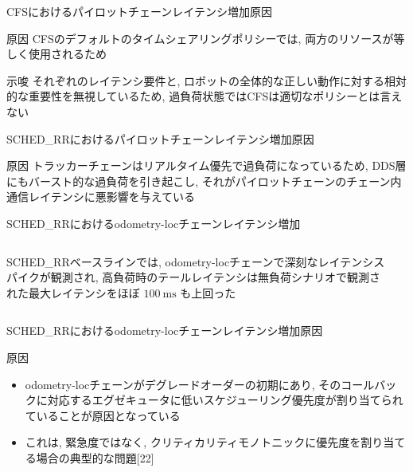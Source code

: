 \begin{frame}{CFSにおけるパイロットチェーンレイテンシ増加原因}
    \begin{block}{原因}
        CFSのデフォルトのタイムシェアリングポリシーでは, 両方のリソースが等しく使用されるため
    \end{block}
    \begin{block}{示唆}
        それぞれのレイテンシ要件と, ロボットの全体的な正しい動作に対する相対的な重要性を無視しているため, 過負荷状態ではCFSは適切なポリシーとは言えない
    \end{block}
\end{frame}

\begin{frame}{SCHED\_RRにおけるパイロットチェーンレイテンシ増加原因}
    \begin{block}{原因}
        トラッカーチェーンはリアルタイム優先で過負荷になっているため, DDS層にもバースト的な過負荷を引き起こし, それがパイロットチェーンのチェーン内通信レイテンシに悪影響を与えている
    \end{block}
\end{frame}

\begin{frame}{SCHED\_RRにおけるodometry-locチェーンレイテンシ増加}
    \begin{columns}
        \begin{column}{0.5\textwidth}
            SCHED\_RRベースラインでは, odometry-locチェーンで深刻なレイテンシスパイクが観測され, 高負荷時のテールレイテンシは無負荷シナリオで観測された最大レイテンシをほぼ $100 \mathrm{~ms}$ も上回った
        \end{column}
        \begin{column}{0.5\textwidth}
        \end{column}
    \end{columns}
\end{frame}

\begin{frame}{SCHED\_RRにおけるodometry-locチェーンレイテンシ増加原因}
    \begin{block}{原因}
        \setlength{\linewidth}{0.98\columnwidth}
        \begin{itemize}
            \item odometry-locチェーンがデグレードオーダーの初期にあり, そのコールバックに対応するエグゼキュータに低いスケジューリング優先度が割り当てられていることが原因となっている
            \item これは, 緊急度ではなく, クリティカリティモノトニックに優先度を割り当てる場合の典型的な問題[22]
        \end{itemize}
    \end{block}
\end{frame}

